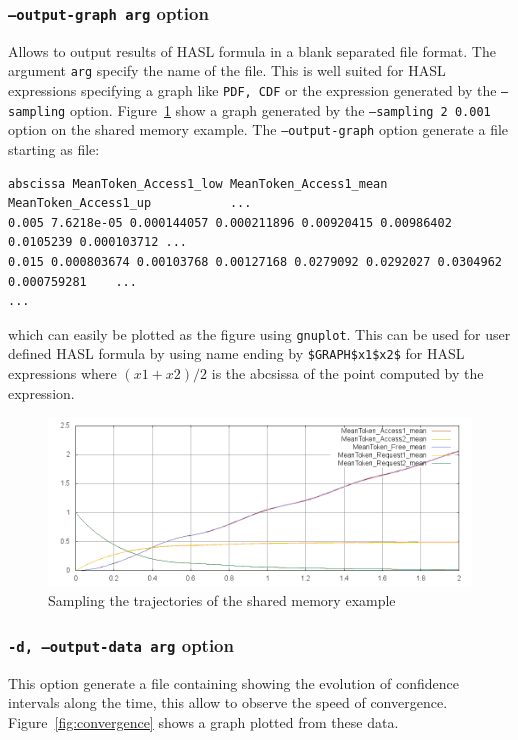 \documentclass{article}
\begin{document}
\subsubsection{\texttt{--output-graph arg} option}
Allows to output results of HASL formula in a blank separated file
format. The argument \texttt{arg} specify the name of the file.  This
is well suited for HASL expressions specifying a graph like
\texttt{PDF, CDF} or the expression generated by the
\texttt{--sampling} option.  Figure~\ref{fig:sampling} show a graph
generated by the \texttt{--sampling 2 0.001} option on the shared
memory example. The \texttt{--output-graph} option generate a file
starting as file:
\begin{scriptsize}
\begin{verbatim}
abscissa MeanToken_Access1_low MeanToken_Access1_mean MeanToken_Access1_up           ... 
0.005 7.6218e-05 0.000144057 0.000211896 0.00920415 0.00986402 0.0105239 0.000103712 ...
0.015 0.000803674 0.00103768 0.00127168 0.0279092 0.0292027 0.0304962 0.000759281    ...
...
\end{verbatim}
\end{scriptsize}
which can easily be plotted as the figure using \texttt{gnuplot}.
This can be used for user defined HASL formula by using name ending by
\verb|$GRAPH$x1$x2$| for HASL expressions where $(x1+x2)/2$ is the
abcsissa of the point computed by the expression.

\begin{figure}[h]
  \centering
  \includegraphics[width=1.01\textwidth]{figures/sampling.png}
  \caption{Sampling the trajectories of the shared memory example}
  \label{fig:sampling}
\end{figure}

\subsubsection{\texttt{-d, --output-data arg} option}
This option generate a file containing showing the evolution of 
confidence intervals along the time, this allow to observe the
speed of convergence. Figure~\ref{fig:convergence} shows a graph
plotted from these data. 
\end{document}
